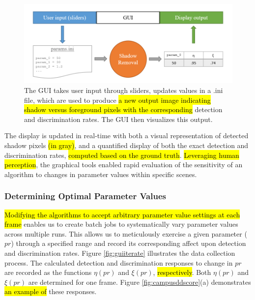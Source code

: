 \begin{figure}
  \centering
  \includegraphics[width=1\linewidth]{figures/gui_model.png}
  \caption{The GUI takes user input through sliders, updates values in a .ini file, which are used to produce \hl{a new output image indicating shadow versus foreground pixels with the corresponding} detection and discrimination rates. The GUI then visualizes this output.}
  \label{fig:guimodel}
\end{figure}

The display is updated in real-time with both a visual representation of detected shadow pixels \hl{(in gray)}, and a quantified display of both the exact detection and discrimination rates, \hl{computed based on the ground truth}. \hl{Leveraging human perception}, the graphical tools enabled rapid evaluation of the sensitivity of an algorithm to changes in parameter values within specific scenes.

\subsubsection{Determining Optimal Parameter Values}

\hl{Modifying the algorithms to accept arbitrary parameter value settings at each frame} enables us to create batch jobs to systematically vary parameter values across multiple runs. This allows us to meticulously exercise a given parameter ($pr$) through a specified range and record its corresponding affect upon detection and discrimination rates. Figure \ref{fig:guiiterate} illustrates the data collection process. The calculated detection and discrimination responses to change in $pr$ are recorded as the functions $\eta(pr)$ and $\xi(pr)$, \hl{respectively}. Both $\eta(pr)$ and $\xi(pr)$ are determined for one frame. Figure \ref{fig:campusddscore}(a) demonstrates \hl{an example of} these responses.

